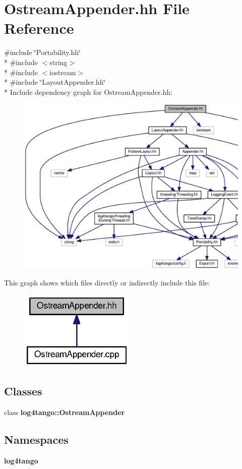\section{Ostream\-Appender.\-hh File Reference}
\label{OstreamAppender_8hh}
{\ttfamily \#include \char`\"{}Portability.\-hh\char`\"{}}\\*
{\ttfamily \#include $<$string$>$}\\*
{\ttfamily \#include $<$iostream$>$}\\*
{\ttfamily \#include \char`\"{}Layout\-Appender.\-hh\char`\"{}}\\*
Include dependency graph for Ostream\-Appender.\-hh\-:
\nopagebreak
\begin{figure}[H]
\begin{center}
\leavevmode
\includegraphics[width=350pt]{d6/d78/OstreamAppender_8hh__incl}
\end{center}
\end{figure}
This graph shows which files directly or indirectly include this file\-:
\nopagebreak
\begin{figure}[H]
\begin{center}
\leavevmode
\includegraphics[width=156pt]{d5/dee/OstreamAppender_8hh__dep__incl}
\end{center}
\end{figure}
\subsection*{Classes}
\begin{DoxyCompactItemize}
\item 
class {\bf log4tango\-::\-Ostream\-Appender}
\end{DoxyCompactItemize}
\subsection*{Namespaces}
\begin{DoxyCompactItemize}
\item 
{\bf log4tango}
\end{DoxyCompactItemize}
